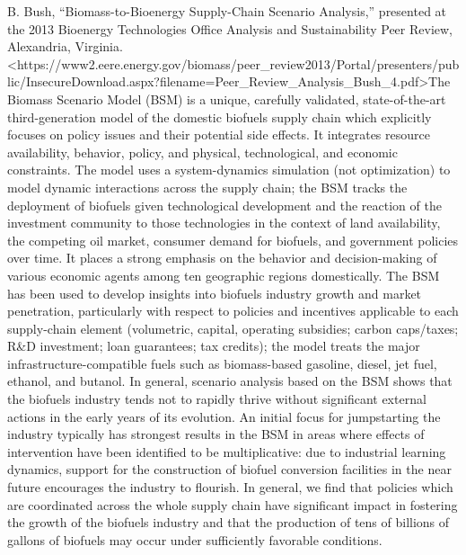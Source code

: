 \documentclass[]{article}
\begin{document}
B. Bush, ``Biomass-to-Bioenergy Supply-Chain Scenario Analysis,''
presented at the 2013 Bioenergy Technologies Office Analysis and
Sustainability Peer Review, Alexandria, Virginia.
\textless{}https://www2.eere.energy.gov/biomass/peer\_review2013/Portal/presenters/public/InsecureDownload.aspx?filename=Peer\_Review\_Analysis\_Bush\_4.pdf\textgreater{}The
Biomass Scenario Model (BSM) is a unique, carefully validated,
state-of-the-art third-generation model of the domestic biofuels supply
chain which explicitly focuses on policy issues and their potential side
effects. It integrates resource availability, behavior, policy, and
physical, technological, and economic constraints. The model uses a
system-dynamics simulation (not optimization) to model dynamic
interactions across the supply chain; the BSM tracks the deployment of
biofuels given technological development and the reaction of the
investment community to those technologies in the context of land
availability, the competing oil market, consumer demand for biofuels,
and government policies over time. It places a strong emphasis on the
behavior and decision-making of various economic agents among ten
geographic regions domestically. The BSM has been used to develop
insights into biofuels industry growth and market penetration,
particularly with respect to policies and incentives applicable to each
supply-chain element (volumetric, capital, operating subsidies; carbon
caps/taxes; R\&D investment; loan guarantees; tax credits); the model
treats the major infrastructure-compatible fuels such as biomass-based
gasoline, diesel, jet fuel, ethanol, and butanol. In general, scenario
analysis based on the BSM shows that the biofuels industry tends not to
rapidly thrive without significant external actions in the early years
of its evolution. An initial focus for jumpstarting the industry
typically has strongest results in the BSM in areas where effects of
intervention have been identified to be multiplicative: due to
industrial learning dynamics, support for the construction of biofuel
conversion facilities in the near future encourages the industry to
flourish. In general, we find that policies which are coordinated across
the whole supply chain have significant impact in fostering the growth
of the biofuels industry and that the production of tens of billions of
gallons of biofuels may occur under sufficiently favorable conditions.
\end{document}
